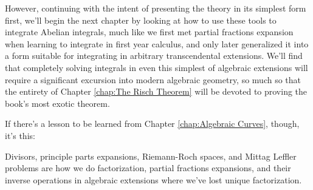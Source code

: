 However, continuing with the intent of presenting the theory in its
simplest form first, we'll begin the next chapter by looking at how to
use these tools to integrate Abelian integrals, much like we first met
partial fractions expansion when learning to integrate in first year
calculus, and only later generalized it into a form suitable for
integrating in arbitrary transcendental extensions.  We'll find that
completely solving integrals in even this simplest of algebraic
extensions will require a significant excursion into modern algebraic
geometry, so much so that the entirety of Chapter \ref{chap:The Risch Theorem}
will be devoted to proving the book's most exotic theorem.

If there's a lesson to be learned from Chapter \ref{chap:Algebraic Curves}, though, it's this:

\begin{key point}
Divisors, principle parts expansions, Riemann-Roch spaces, and Mittag
Leffler problems are how we do factorization, partial fractions
expansions, and their inverse operations in algebraic extensions where
we've lost unique factorization.
\end{key point}
